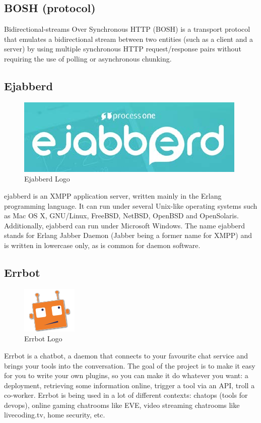 \subsection{BOSH (protocol)}
Bidirectional-streams Over Synchronous HTTP (BOSH) is a transport protocol that emulates a bidirectional
stream between two entities (such as a client and a server) by using multiple synchronous HTTP
request/response pairs without requiring the use of polling or asynchronous chunking.
\subsection{Ejabberd}
\begin{figure}[ht]
\centering
\includegraphics[scale=0.5]{input/images/ej.png}
\caption{Ejabberd Logo}
\end{figure}
ejabberd is an XMPP application server, written mainly in the Erlang programming language. It can run
under several Unix-like operating systems such as Mac OS X, GNU/Linux, FreeBSD, NetBSD, OpenBSD
and OpenSolaris. Additionally, ejabberd can run under Microsoft Windows. The name ejabberd stands for
Erlang Jabber Daemon (Jabber being a former name for XMPP) and is written in lowercase only, as is
common for daemon software.
\subsection{Errbot}
\begin{figure}[ht]
\centering
\includegraphics[scale=0.5]{input/images/er.png}
\caption{Errbot Logo}
\end{figure}
Errbot is a chatbot, a daemon that connects to your favourite chat service and brings your tools into the
conversation. The goal of the project is to make it easy for you to write your own plugins, so you can make
it do whatever you want: a deployment, retrieving some information online, trigger a tool via an API, troll
a co-worker. Errbot is being used in a lot of different contexts: chatops (tools for devops), online gaming
chatrooms like EVE, video streaming chatrooms like livecoding.tv, home security, etc.
